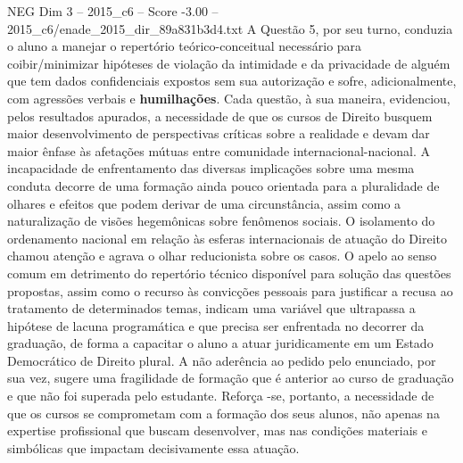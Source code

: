 \begin{textsample}{NEG Dim 3 – 2015\_c6 – Score -3.00 – 2015\_c6/enade\_2015\_dir\_89a831b3d4.txt}
A Questão 5, por seu turno, conduzia o aluno a manejar o repertório teórico-conceitual necessário para coibir/minimizar hipóteses de violação da intimidade e da privacidade de alguém que tem dados confidenciais expostos sem sua autorização e sofre, adicionalmente, com agressões verbais e \textbf{humilhações}.
Cada questão, à sua maneira, evidenciou, pelos resultados apurados, a necessidade de que os cursos de Direito busquem maior desenvolvimento de perspectivas críticas sobre a realidade e devam dar maior ênfase às afetações mútuas entre comunidade internacional-nacional.
A incapacidade de enfrentamento das diversas implicações sobre uma mesma conduta decorre de uma formação ainda pouco orientada para a pluralidade de olhares e efeitos que podem derivar de uma circunstância, assim como a naturalização de visões hegemônicas sobre fenômenos sociais.
O isolamento do ordenamento nacional em relação às esferas internacionais de atuação do Direito chamou atenção e agrava o olhar reducionista sobre os casos.
O apelo ao senso comum em detrimento do repertório técnico disponível para solução das questões propostas, assim como o recurso às convicções pessoais para justificar a recusa ao tratamento de determinados temas, indicam uma variável que ultrapassa a hipótese de lacuna programática e que precisa ser enfrentada no decorrer da graduação, de forma a capacitar o aluno a atuar juridicamente em um Estado Democrático de Direito plural.
A não aderência ao pedido pelo enunciado, por sua vez, sugere uma fragilidade de formação que é anterior ao curso de graduação e que não foi superada pelo estudante.
Reforça -se, portanto, a necessidade de que os cursos se comprometam com a formação dos seus alunos, não apenas na expertise profissional que buscam desenvolver, mas nas condições materiais e simbólicas que impactam decisivamente essa atuação.

\end{textsample}

